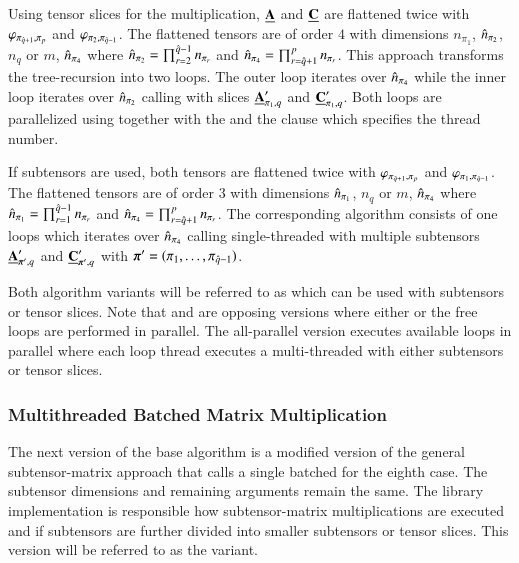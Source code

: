 Using tensor slices for the multiplication, $\underline{\mathbf{A}}$ and $\underline{\mathbf{C}}$ are flattened twice with $\varphi_{\pi_{\hat{q}+1},\pi_p}$ and $\varphi_{\pi_{2},\pi_{\hat{q}-1}}$.
The flattened tensors are of order $4$ with dimensions $n_{\pi_1}$, $\hat{n}_{\pi_2}$, $n_{q}$ or $m$, $\hat{n}_{\pi_4}$ where $\hat{n}_{\pi_2} = \prod_{r=2}^{\hat{q}-1} n_{\pi_r}$ and $\hat{n}_{\pi_4} = \prod_{r=\hat{q}+1}^{p} n_{\pi_r}$.
This approach transforms the tree-recursion into two loops.
The outer loop iterates over $\hat{n}_{\pi_4}$ while the inner loop iterates over $\hat{n}_{\pi_2}$ calling  with slices $\underline{\mathbf{A}}_{\pi_1,q}'$ and $\underline{\mathbf{C}}_{\pi_1,q}'$.
Both loops are parallelized using  together with the  and the  clause which specifies the thread number.


If subtensors are used, both tensors are flattened twice with $\varphi_{\pi_{\hat{q}+1},\pi_p}$ and $\varphi_{\pi_{1},\pi_{\hat{q}-1}}$. 
The flattened tensors are of order $3$ with dimensions $\hat{n}_{\pi_1}$, $n_{q}$ or $m$, $\hat{n}_{\pi_4}$ where $\hat{n}_{\pi_1} = \prod_{r=1}^{\hat{q}-1} n_{\pi_r}$ and $\hat{n}_{\pi_4} = \prod_{r=\hat{q}+1}^{p} n_{\pi_r}$.
The corresponding algorithm consists of one loops which iterates over $\hat{n}_{\pi_4}$ calling single-threaded  with multiple subtensors $\underline{\mathbf{A}}_{\boldsymbol{\pi}',q}'$ and $\underline{\mathbf{C}}_{\boldsymbol{\pi}',q}'$ with $\boldsymbol{\pi}' = (\pi_1,\dots,\pi_{\hat{q}-1})$.

Both algorithm variants will be referred to as  which can be used with subtensors or tensor slices.
Note that  and  are opposing versions where either  or the free loops are performed in parallel.
The all-parallel version  executes available loops in parallel where each loop thread executes a multi-threaded  with either subtensors or tensor slices.

\subsubsection{Multithreaded Batched Matrix Multiplication}
The next version of the base algorithm is a modified version of the general subtensor-matrix approach that calls a single batched  for the eighth case.
The subtensor dimensions and remaining  arguments remain the same.
The library implementation is responsible how subtensor-matrix multiplications are executed and if subtensors are further divided into smaller subtensors or tensor slices.
This version will be referred to as the  variant.
